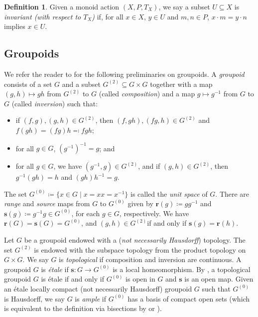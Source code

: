 \documentclass[11pt]{amsart}
\theoremstyle{definition}
\numberwithin{thm}{section}
\numberwithin{equation}{section}
\newtheorem{definition}[thm]{Definition}
\newcommand{\Define}[1]{\emph{#1}}
\newcommand{\emphasis}[1]{\textit{#1}}
\newcommand{\setof}[2]{\{ #1 \mid #2 \}}
\newcommand{\range}{\mathbf{r}}
\newcommand{\source}{\mathbf{s}}
\newcommand{\RPA}[2]{#1 \cdot #2}
\newcommand{\composablepairs}[1]{#1^{(2)}}
\newcommand{\unitspace}[1]{#1^{(0)}}
\begin{document}
\begin{definition}
\label{def:invariant}
Given a monoid action $(X, P, T_X)$, we say a subset $U \subseteq X$ is \Define{invariant (with respect to $T_X$)} if, for all $x \in X$, $y \in U$ and $m, n \in P$, $\RPA{x}{m} = \RPA{y}{n}$ implies $x \in U$.
\end{definition}

\subsection{Groupoids}
\label{sec:groupoids}

We refer the reader to \cite{Pat99,Wil19,SSW20} for the following preliminaries on groupoids.
A \Define{groupoid} consists of a set $G$ and a subset $\composablepairs{G} \subseteq G \times G$ together with a map $(g,h) \mapsto gh$ from $\composablepairs{G}$ to $G$ (called \Define{composition}) and a map $g \mapsto g^{-1}$ from $G$ to $G$ (called \Define{inversion}) such that:
\begin{itemize}
\item if $(f, g),(g, h) \in \composablepairs{G}$, then $(f, gh),(fg, h) \in \composablepairs{G}$ and $f(gh) = (fg)h \eqqcolon fgh$;
\item for all $g \in G$, $(g^{-1})^{-1} = g$; and
\item for all $g \in G$, we have $(g^{-1},g) \in \composablepairs{G}$, and if $(g,h) \in \composablepairs{G}$, then $g^{-1}(gh) = h$ and $(gh)h^{-1} = g$.
\end{itemize}
The set $\unitspace{G} \coloneqq \setof{x \in G}{x = xx = x^{-1}}$ is called the \Define{unit space} of $G$.
There are \Define{range} and \Define{source} maps from $G$ to $\unitspace{G}$ given by $\range(g) \coloneqq gg^{-1}$ and $\source(g) \coloneqq g^{-1}g \in \unitspace{G}$, for each $g \in G$, respectively.
We have $\range(G) = \source(G) = \unitspace{G}$, and $(g, h) \in \composablepairs{G}$if and only if $\source(g) = \range(h)$.

Let $G$ be a groupoid endowed with a (\emphasis{not necessarily Hausdorff}) topology.
The set $\composablepairs{G}$ is endowed with the subspace topology from the product topology on $G \times G$.
We say $G$ is \Define{topological} if composition and inversion are continuous.
A groupoid $G$ is \Define{\'etale} if $\source \colon G \to \unitspace{G}$ is a local homeomorphism. 
By \cite[Theorem 5.18]{Res07}, a topological groupoid $G$ is \'etale if and only if $\unitspace{G}$ is open in $G$ and $\source$ is an open map.
Given an \'etale locally compact (not necessarily Hausdorff) groupoid $G$ such that $\unitspace{G}$ is Hausdorff, we say $G$ is \Define{ample} if $\unitspace{G}$ has a basis of compact open sets (which is equivalent to the definition via bisections by \cite[Proposition 3.6]{Ste10} or \cite[Proposition~4.1]{Exe2010}).
\end{document}
